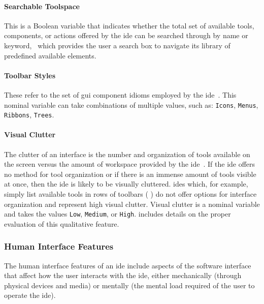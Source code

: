 \paragraph{Searchable Toolspace}
This is a Boolean variable that indicates whether the total set of
available tools, components, or actions offered by the \ac{ide} can be
searched through by name or keyword, \eg \cameleon~which provides the user
a search box to navigate its library of predefined available elements.


\paragraph{Toolbar Styles}
These refer to the set of \ac{gui} component idioms employed by the
\ac{ide}~\cite{galitz2007}. This nominal variable can take combinations of
multiple values, such as: \texttt{Icons}, \texttt{Menus}, \texttt{Ribbons},
\texttt{Trees}.


\paragraph{Visual Clutter}
The clutter of an interface is the number and organization of tools
available on the screen versus the amount of workspace provided by the
\ac{ide}~\cite{cooper2007,galitz2007}. If the \ac{ide} offers no method for
tool organization or if there is an immense amount of tools visible at
once, then the \ac{ide} is likely to be visually cluttered. \acp{ide}
which, for example, simply list available tools in rows of toolbars (\eg
{}) do not offer options for interface organization
and represent high visual clutter. Visual clutter is a nominal variable and
takes the values \texttt{Low}, \texttt{Medium}, or \texttt{High}.
 includes details on the proper evaluation of
this qualitative feature.


\subsubsection{Human Interface Features} \label{subsubsec:humaninterface}

The human interface features of an \ac{ide} include aspects of the software
interface that affect how the user interacts with the \ac{ide}, either
mechanically (\eg through physical devices and media) or mentally (\eg the
mental load required of the user to operate the \ac{ide}).


